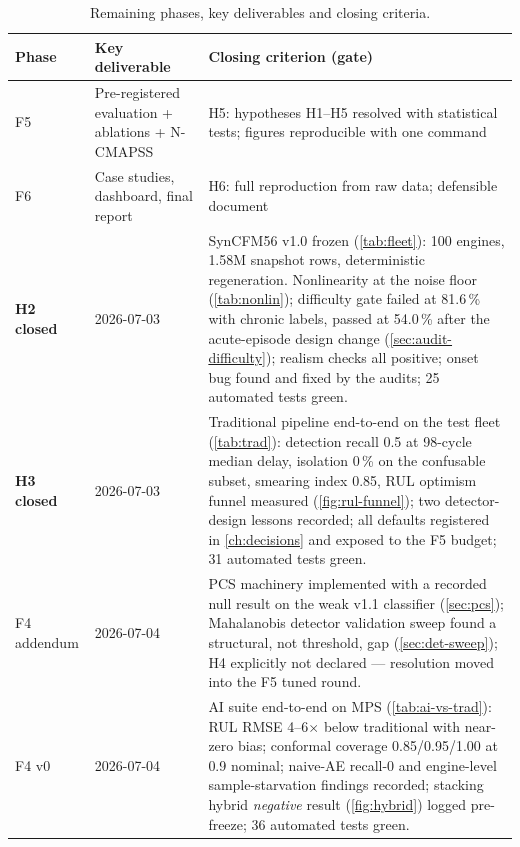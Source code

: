 \begin{table}[htbp]
  \centering\small
  \caption{Remaining phases, key deliverables and closing criteria.}
  \label{tab:remaining-phases}
  \begin{tabular}{p{}p{}p{}}
    \toprule
    Phase & Key deliverable & Closing criterion (gate) \\
    \midrule
    F5 & Pre-registered evaluation + ablations + N-CMAPSS &
         H5: hypotheses H1--H5 resolved with statistical tests; figures reproducible with one
         command \\
    F6 & Case studies, dashboard, final report &
         H6: full reproduction from raw data; defensible document \\
    \textbf{H2 closed} & 2026-07-03 & SynCFM56 v1.0 frozen (\cref{tab:fleet}): 100 engines,
      1.58M snapshot rows, deterministic regeneration. Nonlinearity at the noise floor
      (\cref{tab:nonlin}); difficulty gate failed at 81.6\,\% with chronic labels, passed at
      54.0\,\% after the acute-episode design change (\cref{sec:audit-difficulty}); realism
      checks all positive; onset bug found and fixed by the audits; 25 automated tests green. \\
    \textbf{H3 closed} & 2026-07-03 & Traditional pipeline end-to-end on the test fleet
      (\cref{tab:trad}): detection recall 0.5 at 98-cycle median delay, isolation 0\,\% on
      the confusable subset, smearing index 0.85, RUL optimism funnel measured
      (\cref{fig:rul-funnel}); two detector-design lessons recorded; all defaults registered
      in \cref{ch:decisions} and exposed to the F5 budget; 31 automated tests green. \\
    F4 addendum & 2026-07-04 & PCS machinery implemented with a
      recorded null result on the weak v1.1 classifier (\cref{sec:pcs}); Mahalanobis
      detector validation sweep found a structural, not threshold, gap
      (\cref{sec:det-sweep}); H4 explicitly not declared --- resolution moved into the F5
      tuned round. \\
    F4 v0 & 2026-07-04 & AI suite end-to-end on MPS (\cref{tab:ai-vs-trad}): RUL RMSE
      4--6$\times$ below traditional with near-zero bias; conformal coverage
      0.85/0.95/1.00 at 0.9 nominal; naive-AE recall-0 and engine-level sample-starvation
      findings recorded; stacking hybrid \emph{negative} result (\cref{fig:hybrid}) logged
      pre-freeze; 36 automated tests green. \\
    \bottomrule
  \end{tabular}
\end{table}

